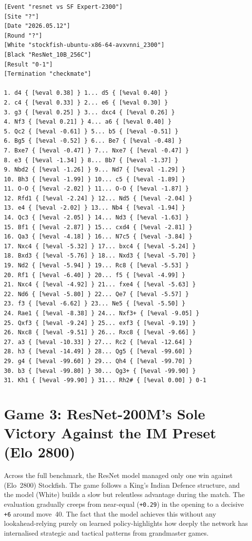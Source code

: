 \begin{verbatim}
[Event "resnet vs SF Expert-2300"]
[Site "?"]
[Date "2026.05.12"]
[Round "?"]
[White "stockfish-ubuntu-x86-64-avxvnni_2300"]
[Black "ResNet_10B_256C"]
[Result "0-1"]
[Termination "checkmate"]

1. d4 { [%eval 0.38] } 1... d5 { [%eval 0.40] } 
2. c4 { [%eval 0.33] } 2... e6 { [%eval 0.30] } 
3. g3 { [%eval 0.25] } 3... dxc4 { [%eval 0.26] } 
4. Nf3 { [%eval 0.21] } 4... a6 { [%eval 0.40] } 
5. Qc2 { [%eval -0.61] } 5... b5 { [%eval -0.51] } 
6. Bg5 { [%eval -0.52] } 6... Be7 { [%eval -0.48] } 
7. Bxe7 { [%eval -0.47] } 7... Nxe7 { [%eval -0.47] } 
8. e3 { [%eval -1.34] } 8... Bb7 { [%eval -1.37] } 
9. Nbd2 { [%eval -1.26] } 9... Nd7 { [%eval -1.29] } 
10. Bh3 { [%eval -1.99] } 10... c5 { [%eval -1.89] } 
11. O-O { [%eval -2.02] } 11... O-O { [%eval -1.87] } 
12. Rfd1 { [%eval -2.24] } 12... Nd5 { [%eval -2.04] } 
13. e4 { [%eval -2.02] } 13... Nb4 { [%eval -1.94] } 
14. Qc3 { [%eval -2.05] } 14... Nd3 { [%eval -1.63] } 
15. Bf1 { [%eval -2.87] } 15... cxd4 { [%eval -2.81] } 
16. Qa3 { [%eval -4.18] } 16... N7c5 { [%eval -3.84] } 
17. Nxc4 { [%eval -5.32] } 17... bxc4 { [%eval -5.24] } 
18. Bxd3 { [%eval -5.76] } 18... Nxd3 { [%eval -5.70] }
19. Nd2 { [%eval -5.94] } 19... Rc8 { [%eval -5.53] } 
20. Rf1 { [%eval -6.40] } 20... f5 { [%eval -4.99] } 
21. Nxc4 { [%eval -4.92] } 21... fxe4 { [%eval -5.63] }
22. Nd6 { [%eval -5.80] } 22... Qe7 { [%eval -5.57] } 
23. f3 { [%eval -6.62] } 23... Ne5 { [%eval -5.50] } 
24. Rae1 { [%eval -8.38] } 24... Nxf3+ { [%eval -9.05] }
25. Qxf3 { [%eval -9.24] } 25... exf3 { [%eval -9.19] } 
26. Nxc8 { [%eval -9.51] } 26... Rxc8 { [%eval -9.66] } 
27. a3 { [%eval -10.33] } 27... Rc2 { [%eval -12.64] }
28. h3 { [%eval -14.49] } 28... Qg5 { [%eval -99.60] } 
29. g4 { [%eval -99.60] } 29... Qh4 { [%eval -99.70] } 
30. b3 { [%eval -99.80] } 30... Qg3+ { [%eval -99.90] }
31. Kh1 { [%eval -99.90] } 31... Rh2# { [%eval 0.00] } 0-1
\end{verbatim}

\section{Game 3: ResNet-200M's Sole Victory Against the IM Preset (Elo 2800)}
\label{app:game3}

Across the full benchmark, the ResNet model managed only one win against (Elo~2800) Stockfish.
The game follows a King's Indian Defence structure, and the model (White) builds a slow but relentless advantage during the match.
The evaluation gradually creeps from near-equal (\texttt{+0.29}) in the opening to a decisive \texttt{+6} around move~40.
The fact that the model achieves this without any lookahead-relying purely on learned policy-highlights how deeply the network has internalised strategic and tactical patterns from grandmaster games.

